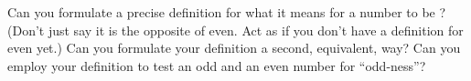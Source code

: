 %
\begin{para}Can you formulate a precise definition for what it means for a number to be ?  (Don't just say it is the opposite of even.  Act as if you don't have a definition for even yet.)  Can you formulate your definition a second, equivalent, way?  Can you employ your definition to test an odd and an even number for ``odd-ness''?\end{para}
